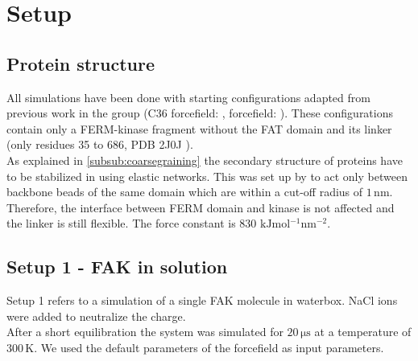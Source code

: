 \chapter{Setup}
\section{Protein structure}
All simulations have been done with starting configurations adapted from previous work in the group (C36 forcefield: \textcite{pap003}, \martini{} forcefield: \textcite{sara}). These configurations contain only a FERM-kinase fragment without the FAT domain and its linker (only residues 35 to 686, PDB 2J0J \autocite{structFAK}).\\
As explained in \autoref{subsub:coarsegraining} the secondary structure of proteins have to be stabilized in \martini{} using elastic networks. This was set up by \textcite{sara} to act only between backbone beads of the same domain which are within a cut-off radius of $1\,\si{\nano\metre}$. Therefore, the interface between FERM domain and kinase is not affected and the linker is still flexible. The force constant is 830 $\si{\kilo\joule\mole^{-1}\nano\meter^{-2}}$. 
\section{Setup 1 - FAK in solution}
\label{setup:setup1}
Setup 1 refers to a \martini{} simulation of a single FAK molecule in waterbox. NaCl ions were added to neutralize the charge.\\
After a short equilibration the system was simulated for $20\,\si{\micro\second}$ at a temperature of $300\,\si{\kelvin}$. We used the default parameters of the \martini{} forcefield as input parameters.
